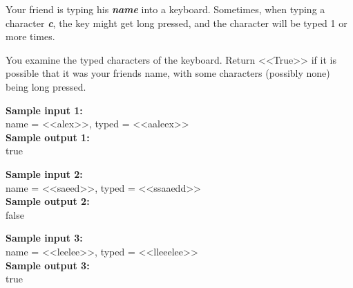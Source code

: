 \documentclass[a4paper]{article}
\begin{document}
Your friend is typing his \textit{\textbf{name}} into a keyboard.  Sometimes, when typing a character  \textit{\textbf{c}}, the key might get long pressed, and the character will be typed 1 or more times.

You examine the typed characters of the keyboard.  Return <<True>> if it is possible that it was your friends name, with some characters (possibly none) being long pressed.

\LINE

\noindent \textbf{Sample input 1:}\\
name = <<alex>>, typed = <<aaleex>>\\


\noindent \textbf{Sample output 1:}\\
true


\SPACE

\noindent \textbf{Sample input 2:}\\
name = <<saeed>>, typed = <<ssaaedd>>\\


\noindent \textbf{Sample output 2:}\\
false


\SPACE

\noindent \textbf{Sample input 3:}\\
name = <<leelee>>, typed = <<lleeelee>>\\


\noindent \textbf{Sample output 3:}\\
true
\end{document}
